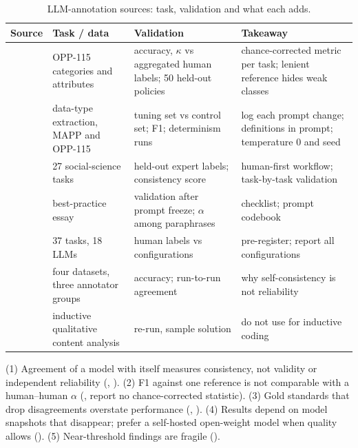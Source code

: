 \begin{table}[t]
\centering\small
\caption{LLM-annotation sources: task, validation and what each adds.}
\label{tab:L-sources}
\begin{tabularx}{\textwidth}{@{}P{2.6cm}P{3.1cm}P{3.3cm}Y@{}}
\toprule
\textbf{Source} & \textbf{Task / data} & \textbf{Validation} & \textbf{Takeaway}\\
\midrule
{} & OPP-115 categories and attributes & accuracy, $\kappa$ vs aggregated human labels; 50 held-out policies & chance-corrected metric per task; lenient reference hides weak classes\\
 & data-type extraction, MAPP and OPP-115 & tuning set vs control set; F1; determinism runs & log each prompt change; definitions in prompt; temperature 0 and seed\\
 & 27 social-science tasks & held-out expert labels; consistency score & human-first workflow; task-by-task validation\\
 & best-practice essay & validation after prompt freeze; $\alpha$ among paraphrases & checklist; prompt codebook\\
 & 37 tasks, 18 LLMs & human labels vs configurations & pre-register; report all configurations\\
 & four datasets, three annotator groups & accuracy; run-to-run agreement & why self-consistency is not reliability\\
 & inductive qualitative content analysis & re-run, sample solution & do not use for inductive coding\\
\bottomrule
\end{tabularx}
\end{table}

\begin{notebox}
(1) Agreement of a model with itself measures consistency, not validity or independent reliability (, ). (2) F1 against one reference is not comparable with a human--human $\alpha$ (,  report no chance-corrected statistic). (3) Gold standards that drop disagreements overstate performance (, ). (4) Results depend on model snapshots that disappear; prefer a self-hosted open-weight model when quality allows (). (5) Near-threshold findings are fragile ().
\end{notebox}

